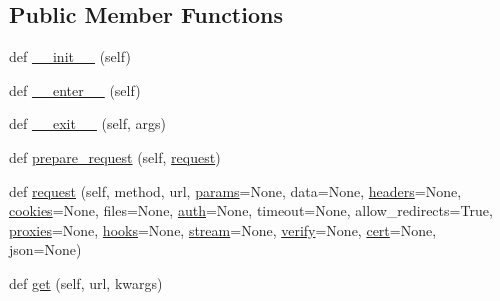\subsection*{Public Member Functions}
\begin{DoxyCompactItemize}
\item 
def \hyperlink{classpip_1_1__vendor_1_1requests_1_1sessions_1_1Session_a2a39b513fc1cf8bfc1c8fc83f0cfda7a}{\+\_\+\+\_\+init\+\_\+\+\_\+} (self)
\item 
def \hyperlink{classpip_1_1__vendor_1_1requests_1_1sessions_1_1Session_a22dd80feb0bad5025c56a77a2e222761}{\+\_\+\+\_\+enter\+\_\+\+\_\+} (self)
\item 
def \hyperlink{classpip_1_1__vendor_1_1requests_1_1sessions_1_1Session_ae5013f17ae3888f010ab1dfd53443d1e}{\+\_\+\+\_\+exit\+\_\+\+\_\+} (self, args)
\item 
def \hyperlink{classpip_1_1__vendor_1_1requests_1_1sessions_1_1Session_a9ff769c5610b100b08ca3a357b44eb2a}{prepare\+\_\+request} (self, \hyperlink{classpip_1_1__vendor_1_1requests_1_1sessions_1_1Session_a718b60e99280c6ef1a346cb6dc0a90c8}{request})
\item 
def \hyperlink{classpip_1_1__vendor_1_1requests_1_1sessions_1_1Session_a718b60e99280c6ef1a346cb6dc0a90c8}{request} (self, method, url, \hyperlink{classpip_1_1__vendor_1_1requests_1_1sessions_1_1Session_af18ffa40a3a6d96caa694d37159c9dd3}{params}=None, data=None, \hyperlink{classpip_1_1__vendor_1_1requests_1_1sessions_1_1Session_a260a167342ae13fa3250628c9224364c}{headers}=None, \hyperlink{classpip_1_1__vendor_1_1requests_1_1sessions_1_1Session_a3996fdb2223c510c41f9a770e3962c4a}{cookies}=None, files=None, \hyperlink{classpip_1_1__vendor_1_1requests_1_1sessions_1_1Session_adc56ee363c5aa9771d07b94f4dbe4383}{auth}=None, timeout=None, allow\+\_\+redirects=True, \hyperlink{classpip_1_1__vendor_1_1requests_1_1sessions_1_1Session_ac1be9a4669d07d146c60ee9118f0d7da}{proxies}=None, \hyperlink{classpip_1_1__vendor_1_1requests_1_1sessions_1_1Session_ae9afe46aed89b72d37046c92982db003}{hooks}=None, \hyperlink{classpip_1_1__vendor_1_1requests_1_1sessions_1_1Session_a10665226c0b2c5be18e641d17cb06591}{stream}=None, \hyperlink{classpip_1_1__vendor_1_1requests_1_1sessions_1_1Session_a6f3eac9bc19bd50f242e8189c0b2fd45}{verify}=None, \hyperlink{classpip_1_1__vendor_1_1requests_1_1sessions_1_1Session_a20cd9cccb44cd8de5a626e4f99e468ef}{cert}=None, json=None)
\item 
def \hyperlink{classpip_1_1__vendor_1_1requests_1_1sessions_1_1Session_adf546460280c8f2ff702345867d50f5f}{get} (self, url, kwargs)

\end{DoxyCompactItemize}
